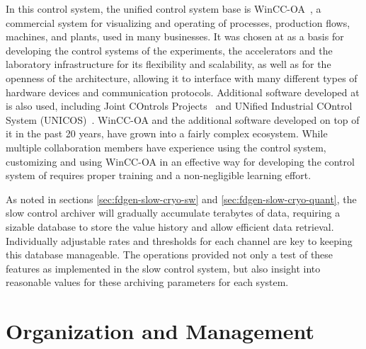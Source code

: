 In this control system, the unified control system base is WinCC-OA~\cite{winccoa}, a commercial  system for visualizing and operating of processes, production flows, machines, and plants, used
in many businesses. It was chosen at  as a basis for
developing the control systems of the  experiments, the
accelerators and the laboratory infrastructure for its flexibility and
scalability, as well as for the openness of the architecture, allowing
it to interface with many different types of hardware devices and
communication protocols. Additional software developed at 
is also used, including Joint COntrols Projects~\cite{jcop} and UNified
Industrial COntrol System (UNICOS)~\cite{unicos}.  WinCC-OA and the
additional software developed on top of it in the past 20 years, have
grown into a fairly complex ecosystem. While multiple collaboration
members have experience using the  control system,
customizing and using WinCC-OA in an effective way for developing the
control system of  requires proper training and a
non-negligible learning effort.


As noted in sections \ref{sec:fdgen-slow-cryo-sw} and \ref{sec:fdgen-slow-cryo-quant},
the slow control archiver will gradually accumulate terabytes of
data, requiring a sizable database to store the value history and
allow efficient data retrieval. Individually adjustable rates and
thresholds for each channel are key to keeping this database
manageable. The  operations provided not only a test of
these features as implemented in the  slow control system, but also insight into
reasonable values for these archiving parameters for each system.


\section{Organization and Management}
\label{sec:cisc-slow-controls-org}



